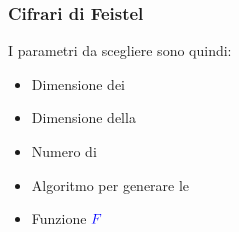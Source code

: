 	\begin{frame}
		\frametitle{Cifrari di Feistel}		
		I parametri da scegliere sono quindi:
		\begin{itemize}
			\item Dimensione dei 
			\item Dimensione della 
			\item Numero di 
			\item Algoritmo per generare le 
			\item Funzione $\textcolor{blue}{F}$
		\end{itemize}
	\end{frame}

